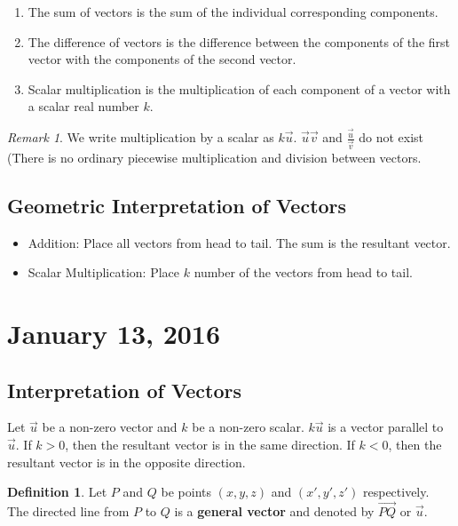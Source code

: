 \documentclass[11pt]{article}
\theoremstyle{plain} %
\theoremstyle{definition}
\newtheorem*{definition}{Definition} %
\theoremstyle{example}
\theoremstyle{remark}
\newtheorem*{remark}{Remark}
\begin{document}
\begin{enumerate}
	\item The sum of vectors is the sum of the individual corresponding components. 
	\item The difference of vectors is the difference between the components of the first vector with the components of the second vector.
	\item Scalar multiplication is the multiplication of each component of a vector with a scalar real number $k$. 
\end{enumerate}

\begin{remark}
We write multiplication by a scalar as $k\vec{u}$. $\vec{u}\vec{v}$ and $\frac{\vec{u}}{\vec{v}}$ do not exist (There is no ordinary piecewise multiplication and division between vectors. 
\end{remark}

\subsection{Geometric Interpretation of Vectors}

\begin{itemize}
	\item Addition: Place all vectors from head to tail. The sum is the resultant vector.
	\item Scalar Multiplication: Place $k$ number of the vectors from head to tail. 
\end{itemize}
	
	
\section{January 13, 2016}

\subsection{Interpretation of Vectors}
Let $\vec{u}$ be a non-zero vector and $k$ be a non-zero scalar. $k\vec{u}$ is a vector parallel to $\vec{u}$. If $k >0$, then the resultant vector is in the same direction. If $k<0$, then the resultant vector is in the opposite direction. 

\begin{definition}
Let $P$ and $Q$ be points $(x, y, z)$ and $(x', y', z')$ respectively. The directed line from $P$ to $Q$ is a \textbf{general vector} and denoted by $\overrightarrow{PQ}$ or $\vec{u}$.\\
\end{definition}
\end{document}
